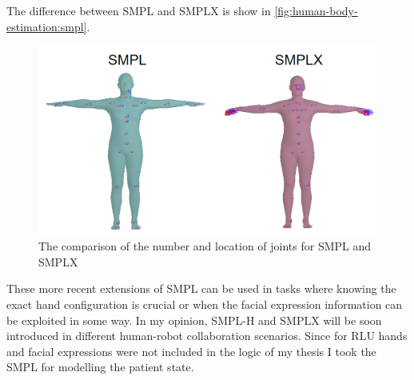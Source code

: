 The difference between SMPL and SMPLX is show in \autoref{fig:human-body-estimation:smpl}.
\begin{figure}[h]
    \centering
    \includegraphics[width=0.7\linewidth]{images/smpl.png}
    \caption{The comparison of the number and location of joints for SMPL and SMPLX}
    \label{fig:human-body-estimation:smpl}
\end{figure}
These more recent extensions of SMPL can be used in tasks where knowing the exact hand configuration is crucial or when the facial expression information can be exploited in some way. In my opinion, SMPL-H and SMPLX will be soon introduced in different human-robot collaboration scenarios. Since for RLU hands and facial expressions were not included in the logic of my thesis I took the SMPL for modelling the patient state.

